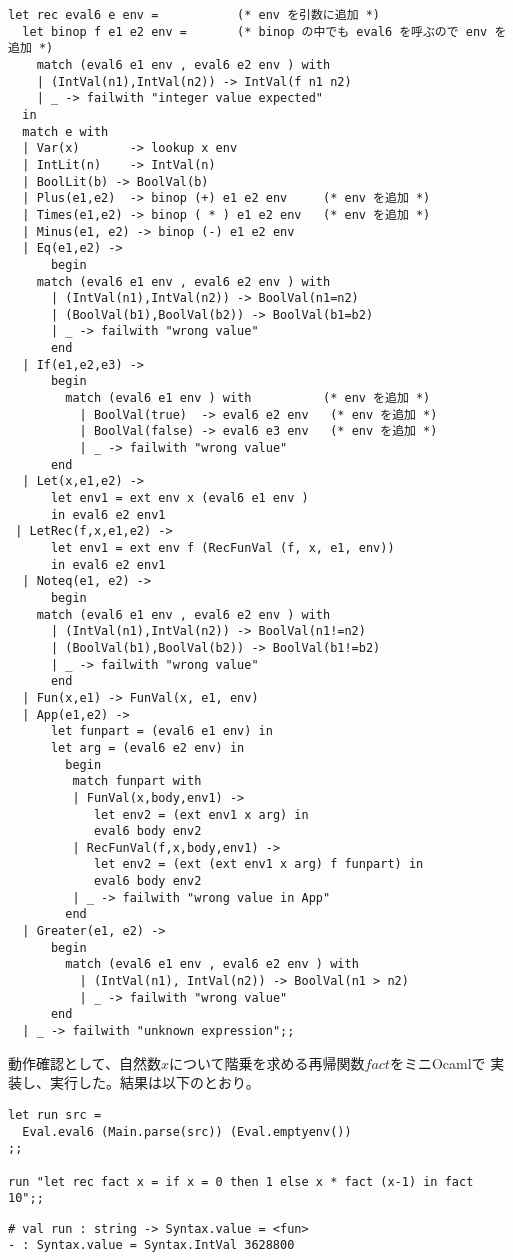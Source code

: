 \documentclass[a4paper,9pt]{jsarticle}
\begin{document}
\begin{lstlisting}
let rec eval6 e env =           (* env を引数に追加 *)
  let binop f e1 e2 env =       (* binop の中でも eval6 を呼ぶので env を追加 *)
    match (eval6 e1 env , eval6 e2 env ) with
    | (IntVal(n1),IntVal(n2)) -> IntVal(f n1 n2)
    | _ -> failwith "integer value expected"
  in 
  match e with
  | Var(x)       -> lookup x env
  | IntLit(n)    -> IntVal(n)
  | BoolLit(b) -> BoolVal(b)
  | Plus(e1,e2)  -> binop (+) e1 e2 env     (* env を追加 *)
  | Times(e1,e2) -> binop ( * ) e1 e2 env   (* env を追加 *)
  | Minus(e1, e2) -> binop (-) e1 e2 env
  | Eq(e1,e2) ->
      begin
	match (eval6 e1 env , eval6 e2 env ) with
	  | (IntVal(n1),IntVal(n2)) -> BoolVal(n1=n2)
	  | (BoolVal(b1),BoolVal(b2)) -> BoolVal(b1=b2)
	  | _ -> failwith "wrong value"
      end
  | If(e1,e2,e3) ->
      begin
        match (eval6 e1 env ) with          (* env を追加 *)
          | BoolVal(true)  -> eval6 e2 env   (* env を追加 *)
          | BoolVal(false) -> eval6 e3 env   (* env を追加 *)
          | _ -> failwith "wrong value"
      end
  | Let(x,e1,e2) -> 
      let env1 = ext env x (eval6 e1 env )
      in eval6 e2 env1 
 | LetRec(f,x,e1,e2) ->
      let env1 = ext env f (RecFunVal (f, x, e1, env))
      in eval6 e2 env1
  | Noteq(e1, e2) ->
      begin
	match (eval6 e1 env , eval6 e2 env ) with
	  | (IntVal(n1),IntVal(n2)) -> BoolVal(n1!=n2)
	  | (BoolVal(b1),BoolVal(b2)) -> BoolVal(b1!=b2)
	  | _ -> failwith "wrong value"
      end
  | Fun(x,e1) -> FunVal(x, e1, env)
  | App(e1,e2) ->
      let funpart = (eval6 e1 env) in
      let arg = (eval6 e2 env) in
        begin
         match funpart with
         | FunVal(x,body,env1) ->
            let env2 = (ext env1 x arg) in
            eval6 body env2
         | RecFunVal(f,x,body,env1) ->
            let env2 = (ext (ext env1 x arg) f funpart) in
            eval6 body env2
         | _ -> failwith "wrong value in App"
        end
  | Greater(e1, e2) -> 
      begin
        match (eval6 e1 env , eval6 e2 env ) with
          | (IntVal(n1), IntVal(n2)) -> BoolVal(n1 > n2)
          | _ -> failwith "wrong value"
      end
  | _ -> failwith "unknown expression";;
\end{lstlisting}


動作確認として、自然数$x$について階乗を求める再帰関数$fact$をミニOcamlで
実装し、実行した。結果は以下のとおり。

\begin{lstlisting}
let run src =
  Eval.eval6 (Main.parse(src)) (Eval.emptyenv())
;;

run "let rec fact x = if x = 0 then 1 else x * fact (x-1) in fact 10";;
\end{lstlisting}
\begin{lstlisting}
# val run : string -> Syntax.value = <fun>
- : Syntax.value = Syntax.IntVal 3628800
\end{lstlisting}
\end{document}
